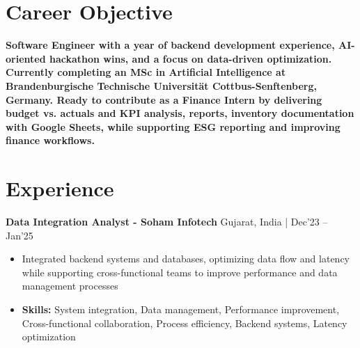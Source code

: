 \documentclass[a4paper,11pt]{article}
\begin{document}
\vspace{-7mm}

\section{\textbf{Career Objective}}
\vspace{1mm}

\textbf{Software Engineer with a year of backend development experience, AI-oriented hackathon wins, and a focus on data-driven optimization. Currently completing an MSc in Artificial Intelligence at Brandenburgische Technische Universität Cottbus-Senftenberg, Germany. Ready to contribute as a Finance Intern by delivering budget vs. actuals and KPI analysis, reports, inventory documentation with Google Sheets, while supporting ESG reporting and improving finance workflows.}
\section{\textbf{Experience}}


\vspace{1mm}
  \textbf{Data Integration Analyst - Soham Infotech} \hfill Gujarat, India | Dec'23 -- Jan'25
\vspace{-1.5mm} %
\begin{itemize}
  \item Integrated backend systems and databases, optimizing data flow and latency while supporting cross-functional teams to improve performance and data management processes


\vspace{-2mm}
  \item \textbf{Skills:} System integration, Data management, Performance improvement, Cross-functional collaboration, Process efficiency, Backend systems, Latency optimization
\end{itemize}
\end{document}
